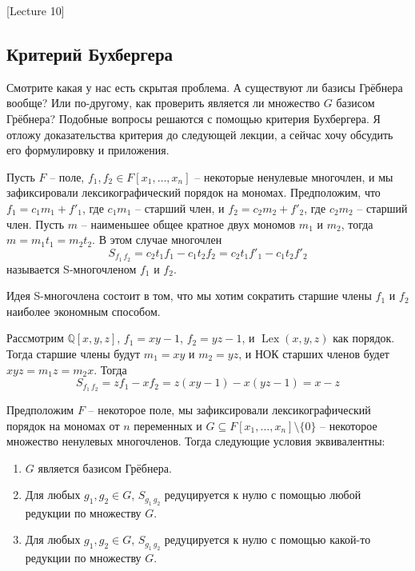 [Lecture 10]


\subsection{Критерий Бухбергера}

Смотрите какая у нас есть  скрытая проблема.
А существуют ли базисы Грёбнера вообще?
Или по-другому, как проверить является ли множество $G$ базисом Грёбнера?
Подобные вопросы решаются с помощью критерия Бухбергера.
Я отложу доказательства критерия до следующей лекции, а сейчас хочу обсудить его формулировку и приложения.

\begin{definition}
\label{def::SPoly}
Пусть $F$ -- поле, $f_1,f_2\in F[x_1,\ldots,x_n]$ -- некоторые ненулевые многочлен, и мы зафиксировали лексикографический порядок на мономах.
Предположим, что $f_1 = c_1 m_1 + f'_1$, где $c_1m_1$ -- старший член, и $f_2 = c_2 m_2 + f'_2$, где $c_2m_2$ -- старший член.
Пусть $m$ -- наименьшее общее кратное двух мономов  $m_1$ и $m_2$, тогда $m = m_1 t_1 = m_2 t_2$.
В этом случае многочлен
\[
S_{f_1\,f_2} = c_2t_1 f_1 - c_1 t_2 f_2 = c_2t_1 f'_1 - c_1 t_2 f'_2
\]
называется S-многочленом $f_1$ и $f_2$.
\end{definition}

Идея S-многочлена состоит в том, что мы хотим сократить старшие члены $f_1$ и $f_2$ наиболее экономным способом.

\begin{example}
\label{example::SPoly}
Рассмотрим $\mathbb Q[x, y, z]$, $f_1 = xy - 1$, $f_2 = yz - 1$, и $\operatorname{Lex}(x, y, z)$ как порядок.
Тогда старшие члены будут $m_1 = xy$ и $m_2 = yz$, и НОК старших членов будет $xyz = m_1 z = m_2 x$.
Тогда
\[
S_{f_1\,f_2} = z f_1 - x f_2 = z(xy - 1) - x(yz - 1) = x-z
\]
\end{example}

\begin{claim}
\label{claim::BuchbergerCritClaim}
Предположим $F$ -- некоторое поле, мы зафиксировали лексикографический порядок на мономах от $n$ переменных и $G\subseteq F[x_1,\ldots,x_n]\setminus\{0\}$ -- некоторое множество ненулевых многочленов.
Тогда следующие условия эквивалентны:
\begin{enumerate}
\item $G$ является базисом Грёбнера.

\item Для любых $g_1,g_2\in G$, $S_{g_1\,g_2}$ редуцируется к нулю с помощью любой редукции по множеству $G$.

\item Для любых $g_1,g_2\in G$, $S_{g_1\,g_2}$ редуцируется к нулю с помощью какой-то редукции по множеству $G$.
\end{enumerate}
\end{claim}

